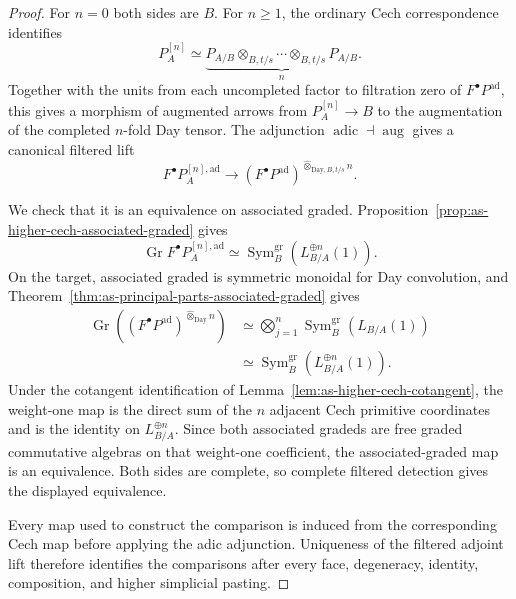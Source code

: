 \begin{proof}
For $n=0$ both sides are $B$.  For $n\geq1$, the ordinary Cech correspondence
identifies
\[
    P_A^{[n]}
    \simeq
    \underbrace{
        P_{A/B}\otimes_{B,t/s}\cdots\otimes_{B,t/s}P_{A/B}
    }_{n}.
\]
Together with the units from each uncompleted factor to filtration zero of
$F^\bullet P^{\mathrm{ad}}$, this gives a morphism of augmented arrows from
$P_A^{[n]}\to B$ to the augmentation of the completed $n$-fold Day tensor.
The adjunction
$\operatorname{adic}\dashv\operatorname{aug}$ gives a canonical filtered
lift
\[
    F^\bullet P_A^{[n],\mathrm{ad}}
    \longrightarrow
    \left(F^\bullet P^{\mathrm{ad}}\right)^{
        \widehat\otimes_{\mathrm{Day},B,t/s}n}.
\]

We check that it is an equivalence on associated graded.
Proposition~\ref{prop:as-higher-cech-associated-graded} gives
\[
    \operatorname{Gr}
    F^\bullet P_A^{[n],\mathrm{ad}}
    \simeq
    \operatorname{Sym}^{\mathrm{gr}}_B
    \left(
        L_{B/A}^{\oplus n}(1)
    \right).
\]
On the target, associated graded is symmetric monoidal for Day convolution,
and Theorem~\ref{thm:as-principal-parts-associated-graded} gives
\[
\begin{aligned}
    \operatorname{Gr}
    \left(
        \left(F^\bullet P^{\mathrm{ad}}\right)^{
        \widehat\otimes_{\mathrm{Day}}n}
    \right)
    &\simeq
    \bigotimes_{j=1}^n
    \operatorname{Sym}^{\mathrm{gr}}_B
    \left(
        L_{B/A}(1)
    \right)\\
    &\simeq
    \operatorname{Sym}^{\mathrm{gr}}_B
    \left(
        L_{B/A}^{\oplus n}(1)
    \right).
\end{aligned}
\]
Under the cotangent identification of
Lemma~\ref{lem:as-higher-cech-cotangent}, the weight-one map is the direct sum
of the $n$ adjacent Cech primitive coordinates and is the identity on
$L_{B/A}^{\oplus n}$.  Since both associated gradeds are free graded
commutative algebras on that weight-one coefficient, the associated-graded
map is an equivalence.  Both sides are complete, so complete filtered
detection gives the displayed equivalence.

Every map used to construct the comparison is induced from the corresponding
Cech map before applying the adic adjunction.  Uniqueness of the filtered
adjoint lift therefore identifies the comparisons after every face,
degeneracy, identity, composition, and higher simplicial pasting.
\end{proof}

